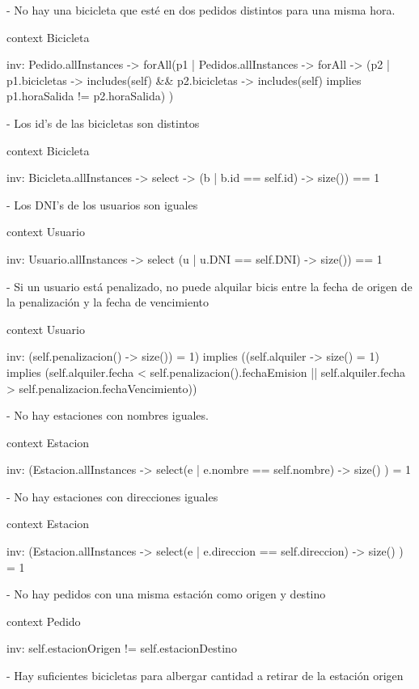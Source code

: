 - No hay una bicicleta que esté en dos pedidos distintos para una misma hora.

context Bicicleta

inv: Pedido.allInstances -> forAll(p1 | Pedidos.allInstances -> forAll -> (p2 | p1.bicicletas -> includes(self) && p2.bicicletas -> includes(self) implies p1.horaSalida != p2.horaSalida) )



- Los id's de las bicicletas son distintos

context Bicicleta

inv: Bicicleta.allInstances -> select -> (b | b.id == self.id) -> size()) == 1



- Los DNI's de los usuarios son iguales

context Usuario

inv: Usuario.allInstances -> select (u | u.DNI == self.DNI) -> size()) == 1



- Si un usuario está penalizado, no puede alquilar bicis entre la fecha de origen de la penalización y la fecha de vencimiento

context Usuario

inv: (self.penalizacion() -> size()) = 1) implies ((self.alquiler -> size() = 1) implies (self.alquiler.fecha < self.penalizacion().fechaEmision || self.alquiler.fecha > self.penalizacion.fechaVencimiento))



- No hay estaciones con nombres iguales.

context Estacion

inv: (Estacion.allInstances -> select(e | e.nombre == self.nombre) -> size() ) = 1



- No hay estaciones con direcciones iguales

context Estacion

inv: (Estacion.allInstances -> select(e | e.direccion == self.direccion) -> size() ) = 1
	


- No hay pedidos con una misma estación como origen y destino

context Pedido

inv: self.estacionOrigen != self.estacionDestino



- Hay suficientes bicicletas para albergar cantidad a retirar de la estación origen

